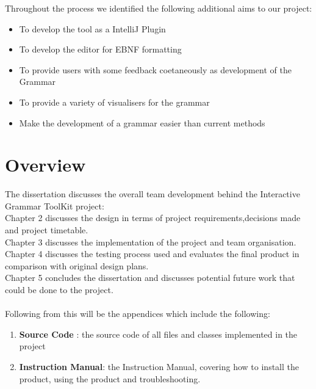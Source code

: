 Throughout the process we identified the following additional aims to our project:
\begin {itemize}
	\item To develop the tool as a IntelliJ Plugin
	\item To develop the editor for EBNF formatting
	\item To provide users with some feedback coetaneously as development of the Grammar
	\item To provide a variety of visualisers for the grammar
	\item Make the development of a grammar easier than current methods
\end{itemize}
 
\section{Overview}
The dissertation discusses the overall team development behind the Interactive Grammar ToolKit project:\\

Chapter 2 discusses the design in terms of project requirements,decisions made and project timetable.\\ 
Chapter 3 discusses the implementation of the project and team organisation.\\
Chapter 4 discusses the testing process used and evaluates the final product in comparison with original design plans.\\
Chapter 5 concludes the dissertation and discusses potential future work that could be done to the project.\\
\\
Following from this will be the appendices which include the following:
\begin {enumerate}
	\item \textbf{Source Code} : the source code of all files and classes implemented in the project
	\item \textbf{Instruction Manual}: the Instruction Manual, covering how to install the product, using the product and troubleshooting.
\end{enumerate}

